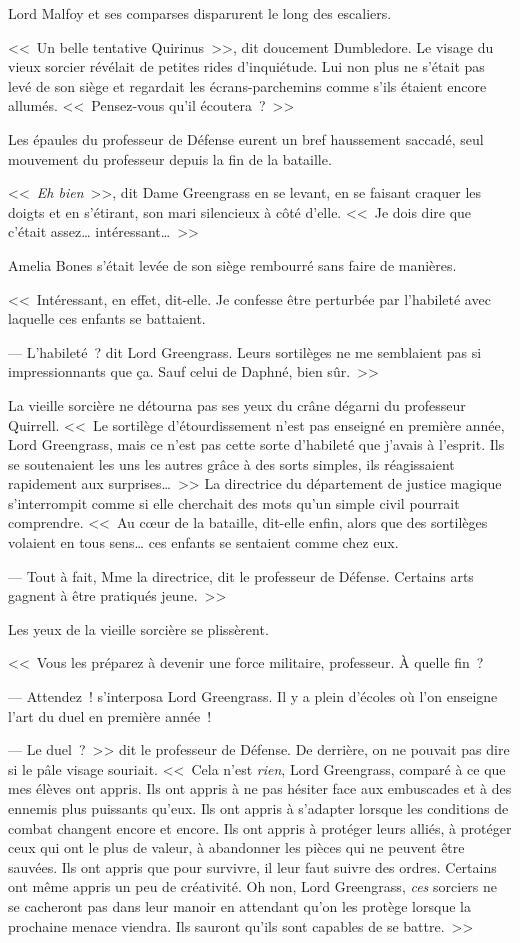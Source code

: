 Lord Malfoy et ses comparses disparurent le long des escaliers.

<<~Un belle tentative Quirinus~>>, dit doucement Dumbledore. Le visage du vieux sorcier révélait de petites rides d'inquiétude. Lui non plus ne s'était pas levé de son siège et regardait les écrans-parchemins comme s'ils étaient encore allumés. <<~Pensez-vous qu'il écoutera~?~>>

Les épaules du professeur de Défense eurent un bref haussement saccadé, seul mouvement du professeur depuis la fin de la bataille.

<<~\emph{Eh bien}~>>, dit Dame Greengrass en se levant, en se faisant craquer les doigts et en s'étirant, son mari silencieux à côté d'elle. <<~Je dois dire que c'était assez… intéressant…~>>

Amelia Bones s'était levée de son siège rembourré sans faire de manières.

<<~Intéressant, en effet, dit-elle. Je confesse être perturbée par l'habileté avec laquelle ces enfants se battaient.

--- L'habileté~? dit Lord Greengrass. Leurs sortilèges ne me semblaient pas si impressionnants que ça. Sauf celui de Daphné, bien sûr.~>>

La vieille sorcière ne détourna pas ses yeux du crâne dégarni du professeur Quirrell. <<~Le sortilège d'étourdissement n'est pas enseigné en première année, Lord Greengrass, mais ce n'est pas cette sorte d'habileté que j'avais à l'esprit. Ils se soutenaient les uns les autres grâce à des sorts simples, ils réagissaient rapidement aux surprises…~>> La directrice du département de justice magique s'interrompit comme si elle cherchait des mots qu'un simple civil pourrait comprendre. <<~Au cœur de la bataille, dit-elle enfin, alors que des sortilèges volaient en tous sens… ces enfants se sentaient comme chez eux.

--- Tout à fait, Mme la directrice, dit le professeur de Défense. Certains arts gagnent à être pratiqués jeune.~>>

Les yeux de la vieille sorcière se plissèrent.

<<~Vous les préparez à devenir une force militaire, professeur. À quelle fin~?

--- Attendez~! s'interposa Lord Greengrass. Il y a plein d'écoles où l'on enseigne l'art du duel en première année~!

--- Le duel~?~>> dit le professeur de Défense. De derrière, on ne pouvait pas dire si le pâle visage souriait. <<~Cela n'est \emph{rien}, Lord Greengrass, comparé à ce que mes élèves ont appris. Ils ont appris à ne pas hésiter face aux embuscades et à des ennemis plus puissants qu'eux. Ils ont appris à s'adapter lorsque les conditions de combat changent encore et encore. Ils ont appris à protéger leurs alliés, à protéger ceux qui ont le plus de valeur, à abandonner les pièces qui ne peuvent être sauvées. Ils ont appris que pour survivre, il leur faut suivre des ordres. Certains ont même appris un peu de créativité. Oh non, Lord Greengrass, \emph{ces} sorciers ne se cacheront pas dans leur manoir en attendant qu'on les protège lorsque la prochaine menace viendra. Ils sauront qu'ils sont capables de se battre.~>>

